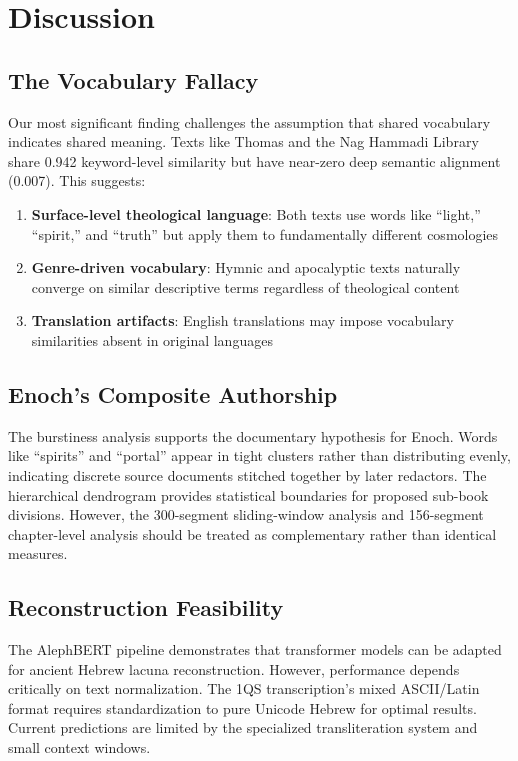 \documentclass[11pt]{article}
\begin{document}
\section{Discussion}

\subsection{The Vocabulary Fallacy}

Our most significant finding challenges the assumption that shared vocabulary indicates shared meaning. Texts like Thomas and the Nag Hammadi Library share 0.942 keyword-level similarity but have near-zero deep semantic alignment (0.007). This suggests:

\begin{enumerate}
    \item \textbf{Surface-level theological language}: Both texts use words like ``light,'' ``spirit,'' and ``truth'' but apply them to fundamentally different cosmologies
    \item \textbf{Genre-driven vocabulary}: Hymnic and apocalyptic texts naturally converge on similar descriptive terms regardless of theological content
    \item \textbf{Translation artifacts}: English translations may impose vocabulary similarities absent in original languages
\end{enumerate}

\subsection{Enoch's Composite Authorship}

The burstiness analysis supports the documentary hypothesis for Enoch. Words like ``spirits'' and ``portal'' appear in tight clusters rather than distributing evenly, indicating discrete source documents stitched together by later redactors. The hierarchical dendrogram provides statistical boundaries for proposed sub-book divisions. However, the 300-segment sliding-window analysis and 156-segment chapter-level analysis should be treated as complementary rather than identical measures.

\subsection{Reconstruction Feasibility}

The AlephBERT pipeline demonstrates that transformer models can be adapted for ancient Hebrew lacuna reconstruction. However, performance depends critically on text normalization. The 1QS transcription's mixed ASCII/Latin format requires standardization to pure Unicode Hebrew for optimal results. Current predictions are limited by the specialized transliteration system and small context windows.
\end{document}

